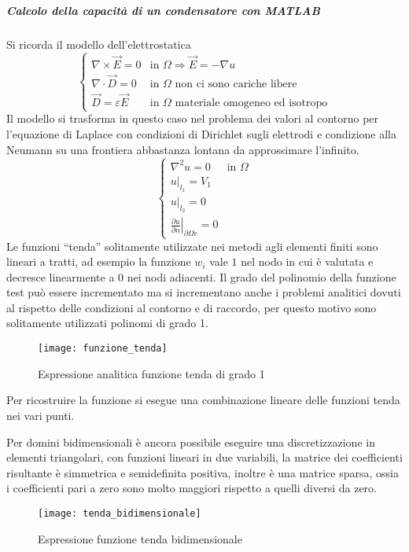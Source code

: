 
\subparagraph{Calcolo della capacità di un condensatore con MATLAB}
Si ricorda il modello dell'elettrostatica
$$
\begin{cases}
\nabla \times \vec{E} = 0 &\text{in } \Omega \Rightarrow \vec{E} = -\nabla u\\
\nabla\cdot\vec{D} = 0 &\text{in }\Omega\text{ non ci sono cariche libere}\\
\vec{D} = \varepsilon\vec{E} &\text{in } \Omega\text{ materiale omogeneo ed isotropo}
\end{cases}
$$
Il modello si trasforma in questo caso nel problema dei valori al contorno
per l'equazione di Laplace con condizioni di Dirichlet sugli elettrodi
e condizione alla Neumann su una frontiera abbastanza lontana da approssimare
l'infinito.
$$
\begin{cases}
\nabla^2 u = 0 & \text{in } \Omega\\
\left.u\right|_{l_1} = V_1\\
\left.u\right|_{l_2} = 0\\
\left.\frac{\partial u}{\partial n}\right|_{\partial\Omega e} = 0
\end{cases}
$$
Le funzioni ``tenda'' solitamente utilizzate nei metodi agli elementi finiti
sono lineari a tratti, ad esempio la funzione $w_i$ vale $1$ nel nodo
in cui è valutata e decresce linearmente a $0$ nei nodi adiacenti.
Il grado del polinomio della funzione test può essere incrementato ma
si incrementano anche i problemi analitici dovuti al rispetto
delle condizioni al contorno e di raccordo, per questo motivo sono solitamente
utilizzati polinomi di grado 1.
\begin{figure}[H]
\centering
\texttt{[image: funzione\_tenda]}
\caption{Espressione analitica funzione tenda di grado 1}
\end{figure}
Per ricostruire la funzione si esegue una combinazione lineare delle
funzioni tenda nei vari punti.

Per domini bidimensionali è ancora possibile eseguire una discretizzazione
in elementi triangolari, con funzioni lineari in due variabili,
la matrice dei coefficienti risultante è simmetrica e semidefinita
positiva, inoltre è una matrice sparsa, ossia i coefficienti pari a zero sono 
molto maggiori rispetto a quelli diversi da zero.
\begin{figure}[H]
\centering
\texttt{[image: tenda\_bidimensionale]}
\caption{Espressione funzione tenda bidimensionale}
\end{figure}





